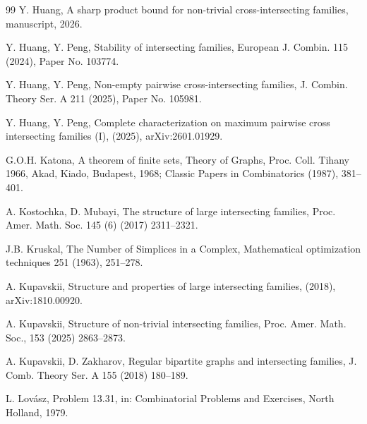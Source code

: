 \documentclass[11pt]{article}
\begin{document}
\begin{thebibliography}{99}
Y. Huang,
A sharp product bound for non-trivial cross-intersecting families, manuscript, 2026.

 
Y. Huang, Y. Peng, 
Stability of intersecting families, 
European J. Combin. 115 (2024), Paper No. 103774.
 
Y. Huang, Y. Peng, 
Non-empty pairwise cross-intersecting families, 
J. Combin. Theory Ser. A 211 (2025), Paper No. 105981.

Y. Huang, Y. Peng,
Complete characterization on maximum pairwise cross
intersecting families (I), 
(2025), arXiv:2601.01929.
 
G.O.H. Katona,  
A theorem of finite sets, Theory of Graphs, 
Proc. Coll. Tihany 1966, Akad, Kiado,
Budapest, 1968; 
Classic Papers in Combinatorics (1987), 381--401.


A. Kostochka, D. Mubayi, 
The structure of large intersecting families, 
Proc. Amer. Math. Soc. 145 (6) (2017) 2311--2321.

 
J.B. Kruskal, 
The Number of Simplices in a Complex, 
Mathematical optimization techniques 251 (1963), 251–278.

A. Kupavskii, 
Structure and properties of large intersecting families, 
(2018), arXiv:1810.00920. 
 
A. Kupavskii, 
Structure of non-trivial intersecting families, 
Proc. Amer. Math. Soc., 153 (2025) 2863--2873.
 
A. Kupavskii, D. Zakharov, 
Regular bipartite graphs and intersecting families, 
J. Comb. Theory Ser. A 155 (2018) 180--189.
 

L. Lov\'{a}sz, 
Problem 13.31, in: Combinatorial Problems and Exercises, North Holland, 1979.
 

\end{thebibliography}

\iffalse
\end{document}
